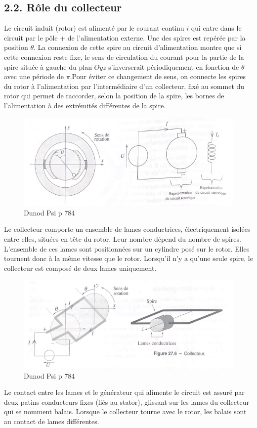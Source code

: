 \documentclass[french, a4paper, 10pt, twocolumn, landscape]{article}
\begin{document}
\subsection*{2.2. Rôle du collecteur}

Le circuit induit (rotor) est alimenté par le courant continu $i$ qui entre dans le circuit par le pôle + de l'alimentation externe. Une des spires est repérée par la position $\theta$. La connexion de cette spire au circuit d'alimentation montre que si cette connexion reste fixe, le sens de circulation du courant pour la partie de la spire située à gauche du plan $Oyz$ s'inverserait périodiquement en fonction de $\theta$ avec une période de $\pi$.Pour éviter ce changement de sens, on connecte les spires du rotor à l'alimentation par l'intermédiaire d'un collecteur, fixé au sommet du rotor qui permet de raccorder, selon la position de la spire, les bornes de l'alimentation à des extrémités différentes de la spire.\medskip
\begin{figure}[ht]
	\centering
	\includegraphics[width=.5\linewidth]{./figures/collecteur1.png}
	\caption{Dunod Psi p 784}
\end{figure}
Le collecteur comporte un ensemble de lames conductrices, électriquement isolées entre elles, situées en tête du rotor. Leur nombre dépend du nombre de spires. L'ensemble de ces lames sont positionnées sur un cylindre posé sur le rotor. Elles tournent donc à la même vitesse que le rotor. Lorsqu'il n'y a qu'une seule spire, le collecteur est composé de deux lames uniquement.

\begin{figure}[ht]
	\centering
	\includegraphics[width=.5\linewidth]{./figures/collecteur2.png}
	\caption{Dunod Psi p 784}
\end{figure}

Le contact entre les lames et le générateur qui alimente le circuit est assuré par deux patins conducteurs fixes (liés au stator), glissant sur les lames du collecteur qui se nomment balais. Lorsque le collecteur tourne avec le rotor, les balais sont au contact de lames différentes. 
\end{document}
